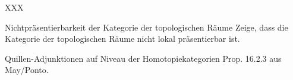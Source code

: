 \documentclass{uebblatt}
\begin{document}

\begin{aufgabe}{XXX}
%
\end{aufgabe}

\begin{aufgabe}{Nichtpräsentierbarkeit der Kategorie der topologischen Räume}
Zeige, dass die Kategorie der topologischen Räume nicht lokal präsentierbar
ist.
\end{aufgabe}

\begin{aufgabe}{Quillen-Adjunktionen auf Niveau der Homotopiekategorien}
Prop. 16.2.3 aus May/Ponto.
\end{aufgabe}
\end{document}
